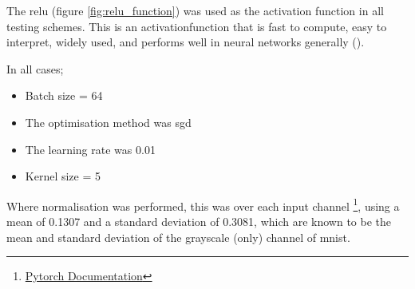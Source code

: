 The \gls{relu} (figure \ref{fig:relu_function}) was used as the activation function in all testing schemes. This is an \gls{activationfunction} that is fast to compute, easy to interpret, widely used, and performs well in neural networks generally (\cite{activation_search}). 
\bigskip

In all cases;

\begin{itemize}
    \itemsep-1em 
    \item Batch size = 64
    \item The optimisation method was \gls{sgd}
    \item The learning rate was 0.01
    \item Kernel size = 5
\end{itemize}

Where normalisation was performed, this was over each input channel \footnote{\href{https://pytorch.org/docs/stable/torchvision/transforms.html}{Pytorch Documentation}}, using a mean of 0.1307 and a standard deviation of 0.3081, which are known to be the mean and standard deviation of the grayscale (only) channel of \gls{mnist}.


